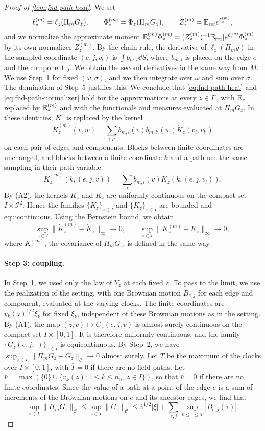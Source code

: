\begin{proof}[Proof of \cref{lem:fnd-path-heat}]
We set
\[
 \ell^{(m)}_z=\ell_z(\Pi_mG_z),\qquad
 \Phi^{(m)}_z=\Phi_z(\Pi_mG_z),\qquad
 Z^{(m)}_z=\mathbb E_{\rm ref}e^{\ell^{(m)}_z},
\]
and we normalize the approximate moment
$\mathbb E^{(m)}_z\Phi^{(m)}_z=(Z^{(m)}_z)^{-1}\mathbb E_{\rm ref}[e^{\ell^{(m)}_z}\Phi^{(m)}_z]$
by its own normalizer $Z^{(m)}_z$. By the chain rule, the derivative of
$\ell_z(\Pi_my)$ in the sampled coordinate $(e,j,v_l)$ is
$\int b_{m,l}\dd S$, where $b_{m,l}$ is placed on the edge $e$ and the
component $j$. We obtain the second derivatives in the same way from
$M$. We use Step~1 for fixed $(\omega,\sigma)$, and we then integrate
over $\omega$ and sum over $\sigma$. The domination of Step~5 justifies
this. We conclude that \eqref{eq:fnd-path-heat} and
\eqref{eq:fnd-path-normalizer} hold for the approximations at every
$z\in I^\circ$, with $\mathbb E_z$ replaced by $\mathbb E^{(m)}_z$ and with the
functionals and
measures evaluated at $\Pi_mG_z$. In these identities, $\dot K_z$ is
replaced by the kernel
\[
 \dot K_z^{(m)}(v,w)
  =\sum_{l,l'}b_{m,l}(v)b_{m,l'}(w)\dot K_z(v_l,v_{l'})
\]
on each pair of edges and components. Blocks between finite coordinates
are unchanged, and blocks between a finite coordinate $k$ and a path use
the same sampling in their path variable:
\[
 \dot K_z^{(m)}(k,(e,j,v))=\sum_lb_{m,l}(v)\dot K_z(k,(e,j,v_l)).
\] By (A2),
the kernels $K_z$ and $\dot K_z$ are uniformly continuous on the
compact set $I\times\mathcal I^2$. Hence the families
$\{K_z\}_{z\in I}$ and $\{\dot K_z\}_{z\in I}$ are bounded and
equicontinuous. Using the Bernstein bound, we obtain
\begin{equation}\label{eq:fnd-path-kernel-limit}
 \sup_{z\in I}\|\dot K_z^{(m)}-\dot K_z\|_\infty\longrightarrow0,
 \qquad
 \sup_{z\in I}\|K_z^{(m)}-K_z\|_\infty\longrightarrow0,
\end{equation}
where $K_z^{(m)}$, the covariance of $\Pi_mG_z$, is defined in the same
way.

\paragraph{Step 3: coupling.}
In Step~1, we used only the law of $Y_z$ at each fixed $z$. To pass to
the limit, we use the realization of the setting, with one Brownian motion
$B_{e,j}$ for each edge and component, evaluated at the varying clocks.
The finite coordinates are $v_k(z)^{1/2}\xi_k$ for fixed
$\xi_k$, independent of these Brownian motions as in the setting.
By (A1), the map $(z,v)\mapsto G_z(e,j,v)$ is almost surely
continuous on the compact set $I\times[0,1]$. It is therefore uniformly
continuous, and the family $\{G_z(e,j,\cdot)\}_{z\in I}$ is
equicontinuous. By Step~2, we have
$\sup_{z\in I}\|\Pi_mG_z-G_z\|_{\mathcal C}\to0$ almost surely. Let
$\bar T$ be the maximum of the clocks over $I\times[0,1]$, with
$\bar T=0$ if there are no field paths. Let
$\bar v=\max(\{0\}\cup\{v_k(z):1\le k\le n_0,\ z\in I\})$, so that
$\bar v=0$ if there are no finite coordinates. Since the value of a path
at a point of the edge $e$ is a sum of
increments of the Brownian motions on $e$ and its ancestor edges, we find
that
\[
 \sup_{z\in I}\|\Pi_mG_z\|_{\mathcal C}\le\sup_{z\in I}\|G_z\|_{\mathcal C}
 \le\bar v^{1/2}|\xi|+\sum_{e,j}\sup_{0\le\tau\le\bar T}|B_{e,j}(\tau)| .
\]


\end{proof}
